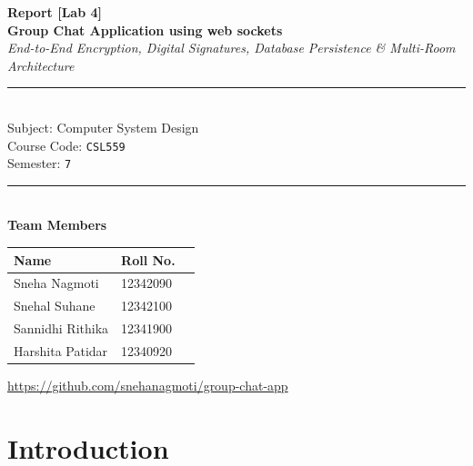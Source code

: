\documentclass[12pt, a4paper]{article}
\begin{document}
\begin{titlepage}
    \centering
    \vspace*{1cm}

    {\LARGE\bfseries Report [Lab 4] }\\[0.5cm]
    {\Huge\bfseries Group Chat Application using web sockets}\\[0.8cm]
    {\large\itshape End-to-End Encryption, Digital Signatures, Database Persistence \& Multi-Room Architecture}\\[1.2cm]

    \rule{\textwidth}{0.5pt}\\[0.5cm]

    {\large Subject: Computer System Design}\\[0.3cm]
    {\large Course Code: \texttt{CSL559}}\\[0.3cm]
    {\large Semester: \texttt{7}}\\[0.5cm]

    \rule{\textwidth}{0.5pt}\\[1.2cm]

    {\large\bfseries Team Members}\\[0.5cm]

    \begin{tabular}{lll}
        \toprule
        \textbf{Name} & \textbf{Roll No.}\\
        \midrule
        Sneha Nagmoti& 12342090 \\
        Snehal Suhane & 12342100 \\
        Sannidhi Rithika & 12341900  \\
        Harshita Patidar & 12340920  \\
        \bottomrule
    \end{tabular}
   

\begin{center}
    \url{https://github.com/snehanagmoti/group-chat-app}
\end{center}

    \vfill

  

\end{titlepage}

\newpage
\tableofcontents
\newpage

\section{Introduction}
\end{document}
